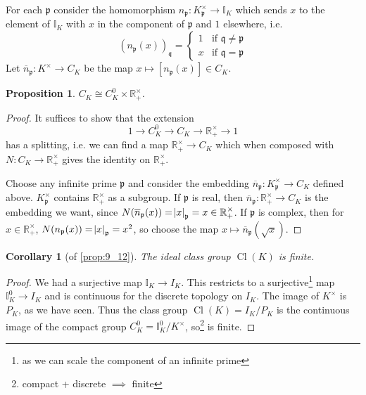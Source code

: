 \documentclass[11pt]{article}
\theoremstyle{definition}
\theoremstyle{plain}
\newtheorem{proposition}[definition]{Proposition}
\newtheorem{corollary}[definition]{Corollary}
\theoremstyle{remark}
\DeclareMathOperator{\Cl}{Cl}
\newcommand{\II}{\mathbb{I}}
\newcommand{\RR}{\mathbb{R}}
\newcommand{\fp}{\mathfrak{p}}
\newcommand{\fq}{\mathfrak{q}}
\begin{document}
For each $\fp$ consider the homomorphism $n_\fp : K_\fp^\times \to \II_K$ which sends $x$ to the element of $\II_K$ with $x$ in the component of $\fp$ and $1$ elsewhere, i.e.
\begin{equation*}
    (n_\fp(x))_\fq =
    \begin{cases}
        1 & \text{if } \fq \neq \fp\\
        x & \text{if } \fq = \fp
    \end{cases}
\end{equation*}
Let $\overline{n}_\fp : K^\times \to C_K$ be the map $x \mapsto [n_\fp(x)] \in C_K$.

\begin{proposition}\label{prop:9_14}
    $C_K \cong C_K^0 \times \RR_+^\times$.
\end{proposition}
\begin{proof}
    It suffices to show that the extension
    \begin{equation*}
        1 \longrightarrow C_K^0 \longrightarrow C_K \longrightarrow \RR_+^\times \longrightarrow 1
    \end{equation*}
    has a splitting, i.e. we can find a map $\RR_+^\times \to C_K$ which when composed with $N : C_K \to \RR_+^\times$ gives the identity on $\RR_+^\times$.

    Choose any infinite prime $\fp$ and consider the embedding $\overline{n}_\fp : K_\fp^\times \to C_K$ defined above. $K_\fp^\times$ contains $\RR_+^\times$ as a subgroup. If $\fp$ is real, then $\overline{n}_\fp : \RR_+^\times \to C_K$ is the embedding we want, since $N(\overline{n}_\fp(x)) = \abs{x}_\fp = x \in \RR_+^\times$. If $\fp$ is complex, then for $x \in \RR_+^\times$, $N(n_\fp(x)) = \abs{x}_\fp = x^2$, so choose the map $x \mapsto \overline{n}_\fp(\sqrt{x})$.
\end{proof}

\begin{corollary}[of \autoref{prop:9_12}]\label{cor:9_15}
    The ideal class group $\Cl(K)$ is finite.
\end{corollary}
\begin{proof}
    We had a surjective map $\II_K \to I_K$. This restricts to a surjective\footnote{as we can scale the component of an infinite prime} map $\II_K^0 \to I_K$ and is continuous for the discrete topology on $I_K$. The image of $K^\times$ is $P_K$, as we have seen. Thus the class group $\Cl(K) = I_K / P_K$ is the continuous image of the compact group $C_K^0 = \II_K^0 / K^\times$, so\footnote{compact + discrete $\implies$ finite} is finite.
\end{proof}
\end{document}
